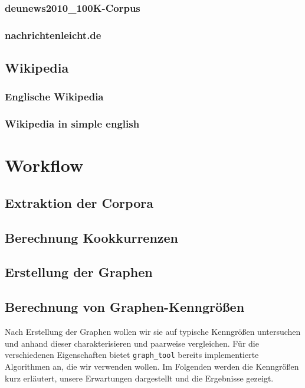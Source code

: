 \documentclass[12pt]{article}
\begin{document}
\subsubsection{deunews2010\_100K-Corpus}

\subsubsection{nachrichtenleicht.de}


\subsection{Wikipedia}

\subsubsection{Englische Wikipedia}

\subsubsection{Wikipedia in simple english}



\section{Workflow}

\subsection{Extraktion der Corpora}


\subsection{Berechnung Kookkurrenzen}


\subsection{Erstellung der Graphen}


\subsection{Berechnung von Graphen-Kenngr\"o\ss{}en}
Nach Erstellung der Graphen wollen wir sie auf typische Kenngrößen untersuchen und anhand dieser charakterisieren und paarweise vergleichen. Für die verschiedenen Eigenschaften bietet \texttt{graph\_tool} bereits implementierte Algorithmen an, die wir verwenden wollen. Im Folgenden werden die Kenngrößen kurz erläutert, unsere Erwartungen dargestellt und die Ergebnisse gezeigt.
\end{document}
